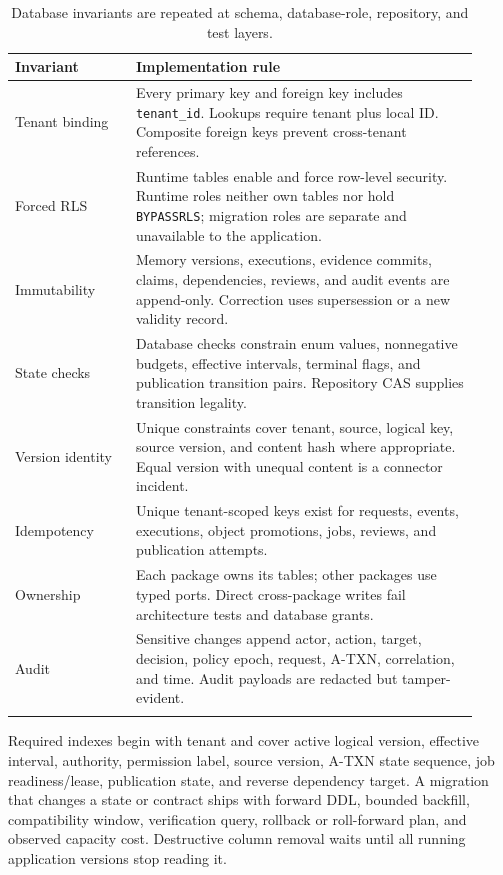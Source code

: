 \documentclass[10pt]{article}
\newcommand{\code}[1]{\texttt{#1}}
\newcommand{\atxn}{\textsc{A-TXN}\xspace}
\begin{document}
\begin{longtable}{L{0.24\linewidth}L{0.68\linewidth}}
\toprule
\textbf{Invariant} & \textbf{Implementation rule} \\
\midrule
\endhead
Tenant binding & Every primary key and foreign key includes \code{tenant\_id}. Lookups require tenant plus local ID. Composite foreign keys prevent cross-tenant references. \\
Forced RLS & Runtime tables enable and force row-level security. Runtime roles neither own tables nor hold \code{BYPASSRLS}; migration roles are separate and unavailable to the application. \\
Immutability & Memory versions, executions, evidence commits, claims, dependencies, reviews, and audit events are append-only. Correction uses supersession or a new validity record. \\
State checks & Database checks constrain enum values, nonnegative budgets, effective intervals, terminal flags, and publication transition pairs. Repository CAS supplies transition legality. \\
Version identity & Unique constraints cover tenant, source, logical key, source version, and content hash where appropriate. Equal version with unequal content is a connector incident. \\
Idempotency & Unique tenant-scoped keys exist for requests, events, executions, object promotions, jobs, reviews, and publication attempts. \\
Ownership & Each package owns its tables; other packages use typed ports. Direct cross-package writes fail architecture tests and database grants. \\
Audit & Sensitive changes append actor, action, target, decision, policy epoch, request, \atxn, correlation, and time. Audit payloads are redacted but tamper-evident. \\
\bottomrule
\caption{Database invariants are repeated at schema, database-role, repository, and test layers.}
\end{longtable}

Required indexes begin with tenant and cover active logical version, effective interval, authority, permission label, source version, \atxn state sequence, job readiness/lease, publication state, and reverse dependency target. A migration that changes a state or contract ships with forward DDL, bounded backfill, compatibility window, verification query, rollback or roll-forward plan, and observed capacity cost. Destructive column removal waits until all running application versions stop reading it.
\end{document}
